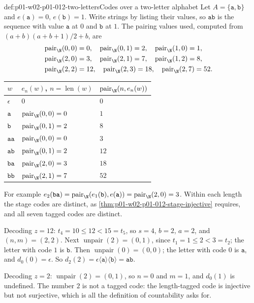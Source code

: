 \begin{hbexample}{def:p01-w02-p01-012-two-letters}{Codes over a two-letter alphabet}
Let \(A=\{\mathtt a,\mathtt b\}\) and \(e(\mathtt a)=0\),
\(e(\mathtt b)=1\). Write strings by listing their values, so
\(\mathtt{ab}\) is the sequence with value \(\mathtt a\) at \(0\) and
\(\mathtt b\) at \(1\). The pairing values used, computed from
\((a+b)(a+b+1)/2+b\), are
\[
\begin{aligned}
  &\operatorname{pair}_{\N}(0,0)=0,\quad
  \operatorname{pair}_{\N}(0,1)=2,\quad
  \operatorname{pair}_{\N}(1,0)=1,\\
  &\operatorname{pair}_{\N}(2,0)=3,\quad
  \operatorname{pair}_{\N}(2,1)=7,\quad
  \operatorname{pair}_{\N}(1,2)=8,\\
  &\operatorname{pair}_{\N}(2,2)=12,\quad
  \operatorname{pair}_{\N}(2,3)=18,\quad
  \operatorname{pair}_{\N}(2,7)=52.
\end{aligned}
\]
\begin{center}
\begin{tabular}{lll}
  \(w\) & \(e_n(w)\), \(n=\operatorname{len}(w)\)
        & \(\operatorname{pair}_{\N}(n,e_n(w))\)\\\hline
  \(\epsilon\) & \(0\) & \(0\)\\
  \(\mathtt a\) & \(\operatorname{pair}_{\N}(0,0)=0\) & \(1\)\\
  \(\mathtt b\) & \(\operatorname{pair}_{\N}(0,1)=2\) & \(8\)\\
  \(\mathtt{aa}\) & \(\operatorname{pair}_{\N}(0,0)=0\) & \(3\)\\
  \(\mathtt{ab}\) & \(\operatorname{pair}_{\N}(0,1)=2\) & \(12\)\\
  \(\mathtt{ba}\) & \(\operatorname{pair}_{\N}(2,0)=3\) & \(18\)\\
  \(\mathtt{bb}\) & \(\operatorname{pair}_{\N}(2,1)=7\) & \(52\)
\end{tabular}
\end{center}
For example
\(e_2(\mathtt{ba})=\operatorname{pair}_{\N}(e_1(\mathtt b),e(\mathtt a))
=\operatorname{pair}_{\N}(2,0)=3\). Within each length the stage codes are
distinct, as \cref{thm:p01-w02-p01-012-stage-injective} requires, and all
seven tagged codes are distinct.

Decoding \(z=12\): \(t_4=10\leq12<15=t_5\), so \(s=4\), \(b=2\), \(a=2\), and
\((n,m)=(2,2)\). Next \(\operatorname{unpair}(2)=(0,1)\), since
\(t_1=1\leq2<3=t_2\); the letter with code \(1\) is \(\mathtt b\). Then
\(\operatorname{unpair}(0)=(0,0)\); the letter with code \(0\) is
\(\mathtt a\), and \(d_0(0)=\epsilon\). So
\(d_2(2)=\epsilon\langle\mathtt a\rangle\langle\mathtt b\rangle=\mathtt{ab}\).

Decoding \(z=2\): \(\operatorname{unpair}(2)=(0,1)\), so \(n=0\) and
\(m=1\), and \(d_0(1)\) is undefined. The number \(2\) is not a tagged code:
the length-tagged code is injective but not surjective, which is all the
definition of countability asks for.
\end{hbexample}


